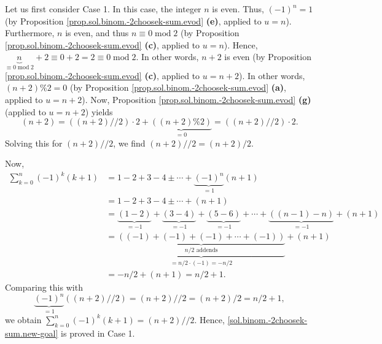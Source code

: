 \documentclass[paper=a4, fontsize=12pt]{scrartcl}%
\let\sumnonlimits\sum
\renewcommand{\sum}{\sumnonlimits\limits}
\theoremstyle{plainsl}
\theoremstyle{definition}
\theoremstyle{remark}
\begin{document}
Let us first consider Case 1. In this case, the integer $n$ is even. Thus,
$\left(  -1\right)  ^{n}=1$ (by Proposition
\ref{prop.sol.binom.-2choosek-sum.evod} \textbf{(e)}, applied to $u=n$).
Furthermore, $n$ is even, and thus $n\equiv0\operatorname{mod}2$ (by
Proposition \ref{prop.sol.binom.-2choosek-sum.evod} \textbf{(c)}, applied to
$u=n$). Hence, $\underbrace{n}_{\equiv0\operatorname{mod}2}+2\equiv
0+2=2\equiv0\operatorname{mod}2$. In other words, $n+2$ is even (by
Proposition \ref{prop.sol.binom.-2choosek-sum.evod} \textbf{(c)}, applied to
$u=n+2$). In other words, $\left(  n+2\right)  \%2=0$ (by Proposition
\ref{prop.sol.binom.-2choosek-sum.evod} \textbf{(a)}, applied to $u=n+2$).
Now, Proposition \ref{prop.sol.binom.-2choosek-sum.evod} \textbf{(g)} (applied
to $u=n+2$) yields
\[
\left(  n+2\right)  =\left(  \left(  n+2\right)  //2\right)  \cdot
2+\underbrace{\left(  \left(  n+2\right)  \%2\right)  }_{=0}=\left(  \left(
n+2\right)  //2\right)  \cdot2.
\]
Solving this for $\left(  n+2\right)  //2$, we find $\left(  n+2\right)
//2=\left(  n+2\right)  /2$.

Now,%
\begin{align*}
\sum_{k=0}^{n}\left(  -1\right)  ^{k}\left(  k+1\right)   &  =1-2+3-4\pm
\cdots+\underbrace{\left(  -1\right)  ^{n}}_{=1}\left(  n+1\right) \\
&  =1-2+3-4\pm\cdots+\left(  n+1\right) \\
&  =\underbrace{\left(  1-2\right)  }_{=-1}+\underbrace{\left(  3-4\right)
}_{=-1}+\underbrace{\left(  5-6\right)  }_{=-1}+\cdots+\underbrace{\left(
\left(  n-1\right)  -n\right)  }_{=-1}+\left(  n+1\right) \\
&  =\underbrace{\underbrace{\left(  \left(  -1\right)  +\left(  -1\right)
+\left(  -1\right)  +\cdots+\left(  -1\right)  \right)  }_{n/2\text{ addends}%
}}_{=n/2\cdot\left(  -1\right)  =-n/2}+\left(  n+1\right) \\
&  =-n/2+\left(  n+1\right)  =n/2+1.
\end{align*}
Comparing this with%
\[
\underbrace{\left(  -1\right)  ^{n}}_{=1}\left(  \left(  n+2\right)
//2\right)  =\left(  n+2\right)  //2=\left(  n+2\right)  /2=n/2+1,
\]
we obtain $\sum_{k=0}^{n}\left(  -1\right)  ^{k}\left(  k+1\right)  =\left(
n+2\right)  //2$. Hence, \eqref{sol.binom.-2choosek-sum.new-goal} is proved in
Case 1.
\end{document}
